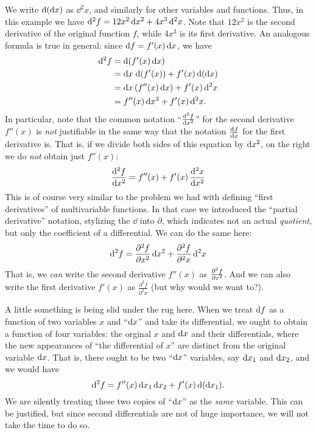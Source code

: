 \documentclass[12pt]{amsart}
\begin{document}
We write $\mathrm{d}(\mathrm{d} x)$ as $\dd^2x$, and similarly for other variables and functions.
Thus, in this example we have $\mathrm{d}^2f = 12x^2\,\mathrm{d} x^2 + 4x^3 \, \mathrm{d}^2x$.
Note that $12x^2$ is the second derivative of the original function $f$, while $4x^3$ is its first derivative.
An analogous formula is true in general: since $\mathrm{d} f = f'(x) \,\mathrm{d} x$, we have
\begin{align}
  \mathrm{d}^2f &= \mathrm{d}(f'(x)\,\mathrm{d} x) \notag\\
  &= \mathrm{d} x \;\mathrm{d}(f'(x)) + f'(x) \, \mathrm{d}(\mathrm{d} x) \notag\\
  &= \mathrm{d} x \,(f''(x)\, \mathrm{d} x) + f'(x) \, \mathrm{d}^2x \notag\\
  &= f''(x) \,\mathrm{d} x^2 + f'(x) \,\mathrm{d}^2x.\label{eq:second-differential}
\end{align}
In particular, note that the common notation ``$\frac{\mathrm{d}^2f}{\mathrm{d} x^2}$'' for the second derivative $f''(x)$ is \emph{not} justifiable in the same way that the notation $\frac{\mathrm{d} f}{\mathrm{d} x}$ for the first derivative is.
That is, if we divide both sides of this equation by $\mathrm{d} x^2$, on the right we do \emph{not} obtain just $f''(x)$:
\[ \frac{\mathrm{d}^2f}{\mathrm{d} x^2} = f''(x) + f'(x) \, \frac{\mathrm{d}^2x}{\mathrm{d} x^2} \]
This is of course very similar to the problem we had with defining ``first derivatives'' of multivariable functions.
In that case we introduced the ``partial derivative'' notation, stylizing the $\dd$ into $\partial$, which indicates not an actual \emph{quotient}, but only the coefficient of a differential.
We can do the same here:
\[ \mathrm{d}^2 f = \frac{\partial^2 f}{\partial x^2} \,\mathrm{d} x^2 + \frac{\partial^2 f}{\partial^2 x} \,\mathrm{d}^2x \]
That is, we \emph{can} write the second derivative $f''(x)$ as $\frac{\partial^2 f}{\partial x^2}$.
And we can also write the first derivative $f'(x)$ as $\frac{\partial^2 f}{\partial^2 x}$ (but why would we want to?).

\begin{adv}
  A little something is being slid under the rug here.
  When we treat $\mathrm{d} f$ as a function of two variables $x$ and ``$\mathrm{d} x$'' and take its differential, we ought to obtain a function of four variables: the orginal $x$ and $\mathrm{d} x$ and their differentials, where the new appearances of ``the differential of $x$'' are distinct from the original variable $\mathrm{d} x$.
  That is, there ought to be two ``$\mathrm{d} x$'' variables, say $\mathrm{d} x_1$ and $\mathrm{d} x_2$, and we would have
  \[ \mathrm{d}^2 f = f''(x) \,\mathrm{d} x_1\,\mathrm{d} x_2 + f'(x) \,\mathrm{d}(\mathrm{d} x_1). \]
  We are silently treating these two copies of ``$\mathrm{d} x$'' as the \emph{same} variable.
  This can be justified, but since second differentials are not of huge importance, we will not take the time to do so.
\end{adv}
\end{document}
